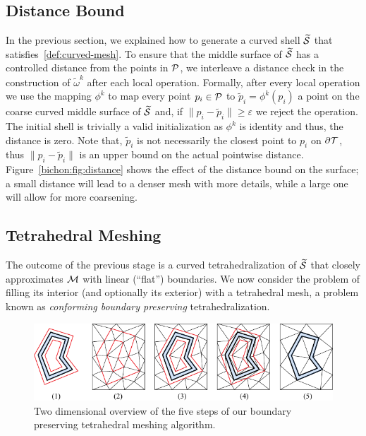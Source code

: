 \subsection{Distance Bound}\label{sec:distance}

In the previous section, we explained how to generate a curved shell $\prS$ that satisfies~\ref{def:curved-mesh}. To ensure that the middle surface of $\prS$ has a controlled distance from the points in $\P$, we interleave a distance check in the construction of $\widetilde\omega^k$ after each local operation. Formally, after every local operation we use the mapping $\phi^k$ to map every point $p_i\in\P$ to $\widetilde p_i = \phi^k(p_i)$ a point on the coarse curved middle surface of $\prS$ and, if $\|p_i-\widetilde p_i\| \geq \varepsilon$ we reject the operation. The initial shell is trivially a valid initialization as $\phi^k$ is identity and thus, the distance is zero. Note that, $\widetilde p_i$ is not necessarily the closest point to $p_i$ on $\partial\T$, thus $\|p_i-\widetilde p_i\|$ is an upper bound on the actual pointwise distance. Figure~\ref{bichon:fig:distance} shows the effect of the distance bound on the surface; a small distance will lead to a denser mesh with more details, while a {large} one will allow for more coarsening.



\subsection{Tetrahedral Meshing}\label{sec:tets}

The outcome of the previous stage is a curved tetrahedralization of $\prS$ that closely approximates $\M$ with linear (``flat'') boundaries. We now consider the problem of filling its interior (and optionally its exterior) with a tetrahedral mesh, a problem known as  \emph{conforming boundary preserving} tetrahedralization. 


\begin{figure}
    \centering
    \includegraphics[width=\linewidth]{curve_meshing_in_shell_tex/figs/illustrations/conforming-overview.pdf}
    \caption{Two dimensional overview of the five steps of our boundary preserving tetrahedral meshing algorithm.}
    \label{bichon:fig:conforming-overview}
\end{figure}

